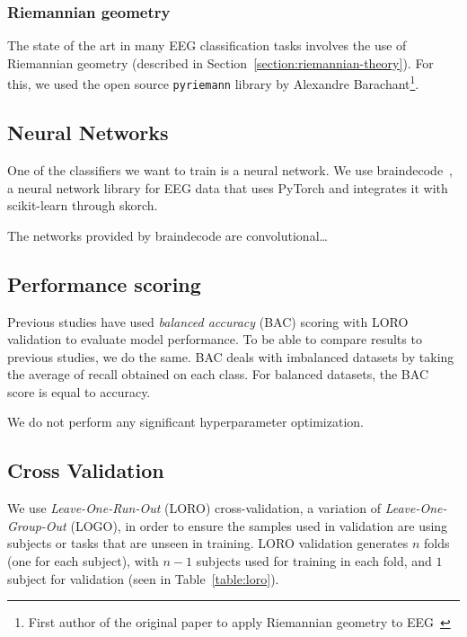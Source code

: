         \subsubsection{Riemannian geometry}

            The state of the art in many EEG classification tasks involves the use of Riemannian geometry (described in Section~\ref{section:riemannian-theory}). For this, we used the open source \texttt{pyriemann} library by Alexandre Barachant\footnote{First author of the original paper to apply Riemannian geometry to EEG~\cite{barachant_classification_2013}}.

    \subsection{Neural Networks}

        One of the classifiers we want to train is a neural network. We use braindecode~\cite{schirrmeister_deep_2017}\cite{noauthor_braindecode_2021}, a neural network library for EEG data that uses PyTorch and integrates it with scikit-learn through skorch.

        The networks provided by braindecode are convolutional\ldots

    \subsection{Performance scoring}

        Previous studies have used \emph{balanced accuracy} (BAC) scoring with LORO validation to evaluate model performance. To be able to compare results to previous studies, we do the same. BAC deals with imbalanced datasets by taking the average of recall obtained on each class. For balanced datasets, the BAC score is equal to accuracy.

        We do not perform any significant hyperparameter optimization.

    \subsection{Cross Validation}

        We use \emph{Leave-One-Run-Out} (LORO) cross-validation, a variation of \emph{Leave-One-Group-Out} (LOGO), in order to ensure the samples used in validation are using subjects or tasks that are unseen in training. LORO validation generates $n$ folds (one for each subject), with $n-1$ subjects used for training in each fold, and $1$ subject for validation (seen in Table~\ref{table:loro}).

